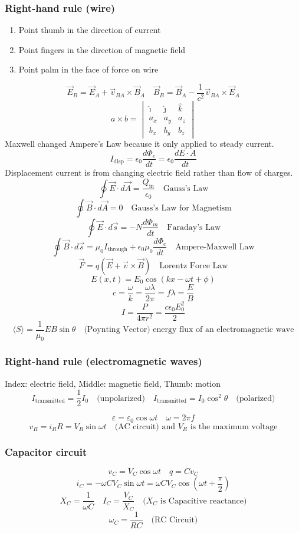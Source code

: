 \documentclass[8pt,twocolumn]{extarticle}
\begin{document}
\subsubsection*{Right-hand rule (wire)}
\begin{enumerate}
    \item Point thumb in the direction of current
    \item Point fingers in the direction of magnetic field
    \item Point palm in the face of force on wire
\end{enumerate}
\[\vec{E}_B = \vec{E}_A + \vec{v}_{BA}\times \vec{B}_A\quad \vec{B}_B = \vec{B}_A - \frac{1}{c^2}
\vec{v}_{BA}\times \vec{E}_A\]
\[a\times b = \begin{vmatrix}
    \hat{\imath} & \hat{\jmath} & \hat{k} \\
    a_x & a_y & a_z \\
    b_x & b_y & b_z
\end{vmatrix}\]
Maxwell changed Ampere's Law because it only applied to steady current.
\[I_\text{disp}=\epsilon_0\frac{d\Phi_e}{dt}=\epsilon_0 \frac{dE\cdot A}{dt}\]
Displacement current is from changing electric field rather than flow of charges.
\[\oint\vec{E}\cdot d\vec{A}=\frac{Q_\text{in}}{\epsilon_0}\quad\text{Gauss's Law}\]
\[\oint\vec{B}\cdot d\vec{A}=0\quad\text{Gauss's Law for Magnetism}\]
\[\oint\vec{E}\cdot d\vec{s} = -N\frac{d\Phi_m}{dt}\quad\text{Faraday's Law}\]
\[\oint\vec{B}\cdot d\vec{s} = \mu_0 I_\text{through} + \epsilon_0 \mu_0 \frac{d\Phi_e}{dt}\quad
\text{Ampere-Maxwell Law}\]
\[\vec{F}=q(\vec{E} + \vec{v} \times \vec{B})\quad\text{Lorentz Force Law}\]
\[E(x, t) = E_0 \cos\left(kx - \omega t + \phi\right)\]
\[c=\frac{\omega}{k}=\frac{\omega\lambda}{2\pi}=f\lambda=\frac{E}{B}\]
\[I=\frac{P}{4\pi r^2}=\frac{c\epsilon_0 E_0^2}{2}\]
\[\langle S \rangle = \frac{1}{\mu_0}EB\sin\theta\quad\text{(Poynting Vector) energy flux of an
electromagnetic wave}\]
\subsubsection*{Right-hand rule (electromagnetic waves)}
Index: electric field, Middle: magnetic field, Thumb: motion
\[I_\text{transmitted}=\frac{1}{2} I_0\quad\text{(unpolarized)}\quad I_\text{transmitted}=I_0\cos^2
\theta\quad\text{(polarized)}\]

\[\varepsilon=\varepsilon_0 \cos\omega t\quad \omega=2\pi f\]
\[v_R = i_R R = V_R\sin\omega t \quad\text{(AC circuit) and $V_R$ is the maximum voltage}\]
\subsubsection*{Capacitor circuit}
\[v_C = V_C\cos\omega t\quad q=Cv_C\]
\[i_C=-\omega CV_C\sin\omega t=\omega CV_C\cos(\omega t + \frac{\pi}{2})\]
\[X_C=\frac{1}{\omega C}\quad I_C=\frac{V_C}{X_C}\quad\text{($X_C$ is Capacitive reactance)}\]
\[\omega_C = \frac{1}{RC}\quad\text{(RC Circuit)}\]
\end{document}
